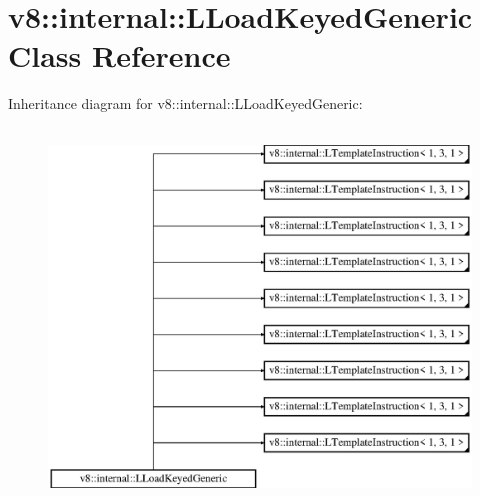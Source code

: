 \hypertarget{classv8_1_1internal_1_1_l_load_keyed_generic}{}\section{v8\+:\+:internal\+:\+:L\+Load\+Keyed\+Generic Class Reference}
\label{classv8_1_1internal_1_1_l_load_keyed_generic}
Inheritance diagram for v8\+:\+:internal\+:\+:L\+Load\+Keyed\+Generic\+:\begin{figure}[H]
\begin{center}
\leavevmode
\includegraphics[height=10.000000cm]{classv8_1_1internal_1_1_l_load_keyed_generic}
\end{center}
\end{figure}
